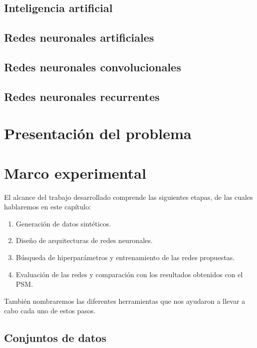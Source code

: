 \documentclass[a4paper,12pt,spanish]{book}
\begin{document}
\section{Inteligencia artificial}


\section{Redes neuronales artificiales} \label{chap:rna}


\section{Redes neuronales convolucionales}


\section{Redes neuronales recurrentes}



\chapter{Presentación del problema} \label{chap:problema}



\chapter{Marco experimental}
El alcance del trabajo desarrollado comprende las siguientes etapas, de las cuales
hablaremos en este capítulo:
\begin{enumerate}[itemsep=0.1cm, label=\textbf{\arabic*.}]
    \item Generación de datos sintéticos.
    \item Diseño de arquitecturas de redes neuronales.
    \item Búsqueda de hiperparámetros y entrenamiento de las redes propuestas.
    \item Evaluación de las redes y comparación con los resultados obtenidos con el PSM.
\end{enumerate}

También nombraremos las diferentes herramientas que nos ayudaron a llevar a cabo
cada uno de estos pasos.

\section{Conjuntos de datos} \label{sec:datos}

\end{document}
